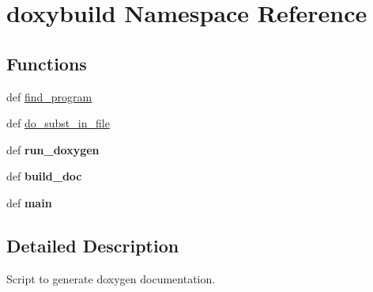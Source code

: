 \hypertarget{namespacedoxybuild}{\section{doxybuild Namespace Reference}
\label{namespacedoxybuild}
}
\subsection*{Functions}
\begin{DoxyCompactItemize}
\item 
def \hyperlink{namespacedoxybuild_a6bdaf84386e33597ba4b372676c4f89f}{find\+\_\+program}
\item 
def \hyperlink{namespacedoxybuild_a77ff3a0812785bf0228074bb01faf74e}{do\+\_\+subst\+\_\+in\+\_\+file}
\item 
\hypertarget{namespacedoxybuild_a94d72352a88b2b8bbc2f4a0aaf08978a}{def {\bfseries run\+\_\+doxygen}}\label{namespacedoxybuild_a94d72352a88b2b8bbc2f4a0aaf08978a}

\item 
\hypertarget{namespacedoxybuild_a87b6b30ab3bde8ea70ec9c6bb406b8da}{def {\bfseries build\+\_\+doc}}\label{namespacedoxybuild_a87b6b30ab3bde8ea70ec9c6bb406b8da}

\item 
\hypertarget{namespacedoxybuild_ae6b8aa589fb85c2bd1520bb5bb36c6ad}{def {\bfseries main}}\label{namespacedoxybuild_ae6b8aa589fb85c2bd1520bb5bb36c6ad}

\end{DoxyCompactItemize}


\subsection{Detailed Description}
\begin{DoxyVerb}Script to generate doxygen documentation.
\end{DoxyVerb}
 

